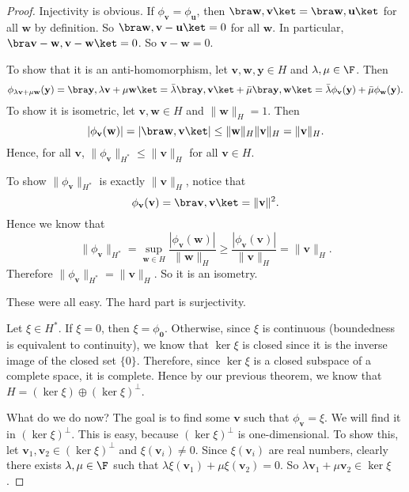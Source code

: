 \documentclass[a4paper]{article}
\begin{document}
\begin{proof}
  Injectivity is obvious. If $\phi_{\mathbf{v}} = \phi_{\mathbf{u}}$, then $\bra \mathbf{w}, \mathbf{v}\ket = \bra \mathbf{w}, \mathbf{u}\ket$ for all $\mathbf{w}$ by definition. So $\bra \mathbf{w}, \mathbf{v} - \mathbf{u}\ket = 0$ for all $\mathbf{w}$. In particular, $\bra \mathbf{v} - \mathbf{w}, \mathbf{v} - \mathbf{w}\ket = 0$. So $\mathbf{v} - \mathbf{w} = 0$.

  To show that it is an anti-homomorphism, let $\mathbf{v}, \mathbf{w}, \mathbf{y} \in H$ and $\lambda, \mu \in \F$. Then
  \[
    \phi_{\lambda\mathbf{v} + \mu \mathbf{w}}(\mathbf{y}) = \bra \mathbf{y}, \lambda \mathbf{v} + \mu \mathbf{w}\ket = \bar{\lambda} \bra \mathbf{y}, \mathbf{v}\ket + \bar{\mu}\bra \mathbf{y}, \mathbf{w}\ket = \bar{\lambda} \phi_{\mathbf{v}}(\mathbf{y}) + \bar{\mu} \phi_{\mathbf{w}} (\mathbf{y}).
  \]
  To show it is isometric, let $\mathbf{v}, \mathbf{w} \in H$ and $\|\mathbf{w}\|_H = 1$. Then
  \[
    |\phi_\mathbf{v}(\mathbf{w})| = |\bra \mathbf{w}, \mathbf{v}\ket| \leq \|\mathbf{w}\|_H \|\mathbf{v}\|_H = \|\mathbf{v}\|_H.
  \]
  Hence, for all $\mathbf{v}$, $\|\phi_\mathbf{v}\|_{H^*} \leq \|\mathbf{v}\|_H$ for all $\mathbf{v} \in H$.

  To show $\|\phi_\mathbf{v}\|_{H^*}$ is exactly $\|\mathbf{v}\|_H$, notice that
  \[
    \phi_\mathbf{v}(\mathbf{v}) = \bra \mathbf{v}, \mathbf{v}\ket = \|\mathbf{v}\|^2.
  \]
  Hence we know that
  \[
    \|\phi_\mathbf{v}\|_{H^*} = \sup_{\mathbf{w} \in H} \frac{|\phi_{\mathbf{v}}(\mathbf{w})|}{\|\mathbf{w}\|_H} \geq \frac{|\phi_{\mathbf{v}}(\mathbf{v})|}{\|\mathbf{v}\|_H} = \|\mathbf{v}\|_H.
  \]
  Therefore $\|\phi_{\mathbf{v}}\|_{H^*} = \|\mathbf{v}\|_H$. So it is an isometry.

  These were all easy. The hard part is surjectivity.

  Let $\xi \in H^*$. If $\xi = 0$, then $\xi = \phi_{\mathbf{0}}$. Otherwise, since $\xi$ is continuous (boundedness is equivalent to continuity), we know that $\ker \xi$ is closed since it is the inverse image of the closed set $\{0\}$. Therefore, since $\ker \xi$ is a closed subspace of a complete space, it is complete. Hence by our previous theorem, we know that $H = (\ker \xi) \oplus (\ker \xi)^\perp$.

  What do we do now? The goal is to find some $\mathbf{v}$ such that $\phi_{\mathbf{v}} = \xi$. We will find it in $(\ker \xi)^\perp$. This is easy, because $(\ker \xi)^\perp$ is one-dimensional. To show this, let $\mathbf{v}_1, \mathbf{v}_2 \in (\ker \xi)^\perp$ and $\xi(\mathbf{v}_i) \not= 0$. Since $\xi(\mathbf{v}_i)$ are real numbers, clearly there exists $\lambda, \mu \in \F$ such that $\lambda \xi(\mathbf{v}_1) + \mu \xi(\mathbf{v}_2) = 0$. So $\lambda \mathbf{v}_1 + \mu \mathbf{v}_2 \in \ker \xi$.


\end{proof}
\end{document}
